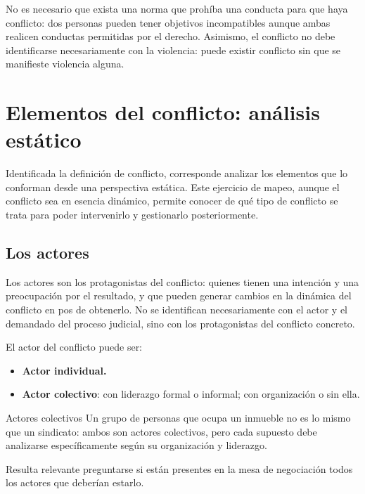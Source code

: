 \documentclass[12pt,oneside]{book}
\begin{document}
\begin{important}
No es necesario que exista una norma que prohíba una conducta para que haya conflicto: dos personas pueden tener objetivos incompatibles aunque ambas realicen conductas permitidas por el derecho. Asimismo, el conflicto no debe identificarse necesariamente con la violencia: puede existir conflicto sin que se manifieste violencia alguna.
\end{important}

\section{Elementos del conflicto: análisis estático}

Identificada la definición de conflicto, corresponde analizar los elementos que lo conforman desde una perspectiva estática. Este ejercicio de mapeo, aunque el conflicto sea en esencia dinámico, permite conocer de qué tipo de conflicto se trata para poder intervenirlo y gestionarlo posteriormente.

\subsection{Los actores}

Los actores son los protagonistas del conflicto: quienes tienen una intención y una preocupación por el resultado, y que pueden generar cambios en la dinámica del conflicto en pos de obtenerlo. No se identifican necesariamente con el actor y el demandado del proceso judicial, sino con los protagonistas del conflicto concreto.

El actor del conflicto puede ser:

\begin{itemize}
    \item \textbf{Actor individual.}
    \item \textbf{Actor colectivo}: con liderazgo formal o informal; con organización o sin ella.
\end{itemize}

\begin{example}{Actores colectivos}
Un grupo de personas que ocupa un inmueble no es lo mismo que un sindicato: ambos son actores colectivos, pero cada supuesto debe analizarse específicamente según su organización y liderazgo.
\end{example}

Resulta relevante preguntarse si están presentes en la mesa de negociación todos los actores que deberían estarlo.
\end{document}
